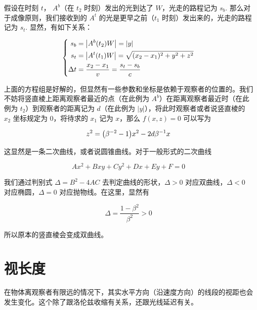 \documentclass[12pt, a4paper, oneside]{ctexbook}
\begin{document}
\par   假设在时刻 $t$， $A^{b}$（在 $t_{2}$ 时刻）发出的光到达了 $W$，光走的路程记为 $s_{b}$. 那么对于成像原则，我们接收到的 $A^{t}$ 的光是更早之前（$t_{1}$ 时刻）发出来的，光走的路程记为 $s_{t}$. 显然，有如下关系：

\begin{equation}
	\left\{\begin{aligned}
		s_{b}&=\qty|A^{b}(t_{2})W|=\qty|y| \\
		s_{t}&=\qty|A^{t}(t_{1})W|=\sqrt{(x_{2}-x_{1})^{2}+y^{2}+z^{2}} \\
		\Delta t&=\frac{x_{2}-x_{1}}{v}=\frac{s_{t}-s_{b}}{c}
	\end{aligned}\right.
\end{equation}

上面的方程组是好解的，但显然有一些参数和坐标是依赖于观察者的位置的。我们不妨将竖直棱上距离观察者最近的点（在此例为 $A^{b}$）在距离观察者最近时（在此例为 $t_{2}$）到观察者的距离记为 $d$（在此例为 $|y|$），将此时观察者或者说竖直棱的 $x_{2}$ 坐标规定为 $0$，将待求的 $x_{1}$ 记为 $x$，那么 $f(x,z)=0$ 可以写为

\begin{equation}
	z^{2}=\qty(\beta^{-2}-1)x^{2}-2d\beta^{-1}x
\end{equation}

这显然是一条二次曲线，或者说圆锥曲线。对于一般形式的二次曲线

\begin{equation}
	Ax^{2}+Bxy+Cy^{2}+Dx+Ey+F=0
\end{equation}

我们通过判别式 $\Delta=B^{2}-4AC$ 去判定曲线的形状，$\Delta>0$ 对应双曲线，$\Delta<0$ 对应椭圆，$\Delta=0$ 对应抛物线。在这里，显然有

\begin{equation}
	\Delta=\frac{1-\beta^{2}}{\beta^{2}}>0
\end{equation}

所以原本的竖直棱会变成双曲线。


\section{视长度}

在物体离观察者有限远的情况下，其实水平方向（沿速度方向）的线段的视距也会发生变化。这个除了跟洛伦兹收缩有关系，还跟光线延迟有关。
\end{document}
